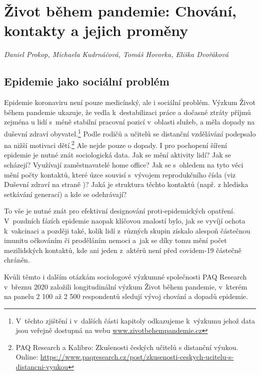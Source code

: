 \chapter{Život během pandemie: Chování, kontakty a jejich proměny}\label{Zmeny_chovani}

\textit{Daniel Prokop, Michaela Kudrnáčová, Tomáš Hovorka, Eliška Dvořáková}
\vspace{15mm}

\section*{Epidemie jako sociální problém}

Epidemie koronaviru není pouze medicínský, ale i sociální problém. Výzkum Život během pandemie ukazuje, že vedla k destabilizaci práce a dočasné ztráty příjmů zejména u lidí s méně stabilní pracovní pozicí v oblasti služeb, a měla dopady na duševní zdraví obyvatel.\footnote{V těchto zjištění i v dalších části kapitoly odkazujeme k výzkumu jehož data jsou veřejně dostupná na webu \url{www.zivotbehempandemie.cz}}  Podle rodičů a učitelů se distanční vzdělávání podepsalo na nižší motivaci dětí.\footnote{PAQ Research a Kalibro: Zkušenosti českých učitelů s distanční výukou. Online: \url{https://www.paqresearch.cz/post/zkusenosti-ceskych-ucitelu-s-distancni-vyukou}} Ale nejde pouze o dopady. I pro pochopení šíření epidemie je nutné znát sociologická data. Jak se mění aktivity lidí? Jak se scházejí? Využívají zaměstnavatelé home office? Jak se s ohledem na tyto věci mění počty kontaktů, které úzce souvisí s vývojem reprodukčního čísla (viz Duševní zdraví na straně \pageref{Dusevni_zdravi})? Jaká je struktura těchto kontaktů (např. z hlediska setkávání generací) a kde se odehrávají?

To vše je nutné znát pro efektivní designování proti-epidemických opatření. V pozdních fázích epidemie naopak klíčovou znalostí bylo, jak se vyvíjí ochota k vakcinaci a později také, kolik lidí z různých skupin získalo alespoň částečnou imunitu očkováním či proděláním nemoci a jak se díky tomu mění počet mezilidských kontaktů, kde ani jeden z aktérů není před covidem-19 částečně chráněn.

Kvůli těmto i dalším otázkám sociologové výzkumné společnosti PAQ Research v březnu 2020 založili longitudinální výzkum Život během pandemie, v kterém na panelu 2 100 až 2 500 respondentů sledují vývoj chování a dopadů epidemie.

